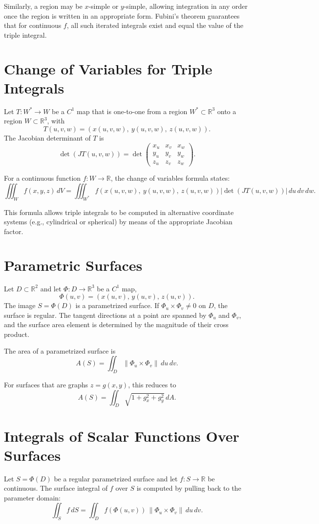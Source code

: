 \documentclass{article}
\begin{document}
Similarly, a region may be \(x\)-simple or \(y\)-simple, allowing integration in any order once the region is written in an appropriate form.  
Fubini's theorem guarantees that for continuous \(f\), all such iterated integrals exist and equal the value of the triple integral.

\section{Change of Variables for Triple Integrals}

Let \(T : W^* \to W\) be a \(C^1\) map that is one-to-one from a region \(W^* \subset \mathbb{R}^3\) onto a region \(W \subset \mathbb{R}^3\), with
\[
T(u,v,w) = (x(u,v,w),\ y(u,v,w),\ z(u,v,w)).
\]
The Jacobian determinant of \(T\) is
\[
\det(JT(u,v,w))
=
\det
\begin{pmatrix}
x_u & x_v & x_w \\
y_u & y_v & y_w \\
z_u & z_v & z_w
\end{pmatrix}.
\]

For a continuous function \(f : W \to \mathbb{R}\), the change of variables formula states:
\[
\iiint_W f(x,y,z)\, dV
=
\iiint_{W^*}
f(x(u,v,w),\ y(u,v,w),\ z(u,v,w))
\left|\det(JT(u,v,w))\right|\, du\, dv\, dw.
\]

This formula allows triple integrals to be computed in alternative coordinate systems (e.g., cylindrical or spherical) by means of the appropriate Jacobian factor.

\section{Parametric Surfaces}
Let \(D \subset \mathbb{R}^2\) and let \(\Phi : D \to \mathbb{R}^3\) be a \(C^1\) map,
\[
\Phi(u,v) = (x(u,v),\, y(u,v),\, z(u,v)).
\]
The image \(S = \Phi(D)\) is a parametrized surface.  
If \(\Phi_u \times \Phi_v \neq 0\) on \(D\), the surface is regular.  
The tangent directions at a point are spanned by \(\Phi_u\) and \(\Phi_v\), and the surface area element is determined by the magnitude of their cross product.

The area of a parametrized surface is
\[
A(S) = \iint_D \|\Phi_u \times \Phi_v\|\, du\, dv.
\]

For surfaces that are graphs \(z = g(x,y)\), this reduces to
\[
A(S) = \iint_D \sqrt{1 + g_x^2 + g_y^2}\, dA.
\]

\section{Integrals of Scalar Functions Over Surfaces}
Let \(S = \Phi(D)\) be a regular parametrized surface and let \(f : S \to \mathbb{R}\) be continuous.  
The surface integral of \(f\) over \(S\) is computed by pulling back to the parameter domain:
\[
\iint_S f\, dS
=
\iint_D 
f(\Phi(u,v))\, \|\Phi_u \times \Phi_v\|\,
du\, dv.
\]
\end{document}
